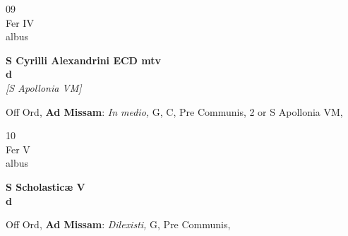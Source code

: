 \documentclass[10pt, openany]{book}
\begin{document}
        \begin{center}
            \begin{minipage}{3.5in}
                \vspace{2em}
                \begin{minipage}{0.5in}
                    {\Huge 09} \\
                    {\normalsize Fer IV} \\
                    {\normalsize albus}
                \end{minipage}
                \begin{minipage}{3.0in}
                    \textbf{ \large S Cyrilli Alexandrini ECD mtv \\
                    \textnormal{\normalsize d}} \\ \textit{[S Apollonia VM]} \\ 
                \end{minipage}
                \begin{justify}Off Ord, \textbf{Ad Missam}: \textit{In medio,} G, C, Pre Communis, 2 or S Apollonia VM,   
                \end{justify}
            \end{minipage}
        \end{center}
    
        \begin{center}
            \begin{minipage}{3.5in}
                \vspace{2em}
                \begin{minipage}{0.5in}
                    {\Huge 10} \\
                    {\normalsize Fer V} \\
                    {\normalsize albus}
                \end{minipage}
                \begin{minipage}{3.0in}
                    \textbf{ \large S Scholasticæ V \\
                    \textnormal{\normalsize d}} \\ 
                \end{minipage}
                \begin{justify}Off Ord, \textbf{Ad Missam}: \textit{Dilexisti,} G, Pre Communis,   
                \end{justify}
            \end{minipage}
        \end{center}
    
\end{document}
